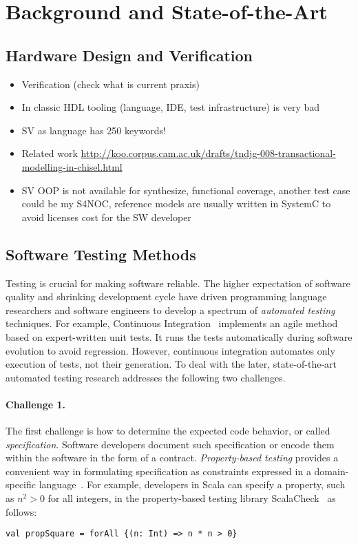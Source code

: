 \documentclass[fleqn,12pt]{article}
\begin{document}
\section{Background and State-of-the-Art}
\label{sec:background}


\subsection{Hardware Design and Verification}

\begin{itemize}
\item Verification (check what is current praxis)
\item In classic HDL tooling (language, IDE, test infrastructure) is very bad
\item SV as language has 250 keywords!
\item Related work \url{http://koo.corpus.cam.ac.uk/drafts/tndjg-008-transactional-modelling-in-chisel.html}
\item SV OOP is not available for synthesize, functional coverage, another test case could be my S4NOC, reference models are usually written in SystemC to avoid licenses cost for the SW developer
\end{itemize}


\subsection{Software Testing Methods}
Testing is crucial for making software reliable. The higher
expectation of software quality and shrinking development cycle have
driven programming language researchers and software engineers to
develop a spectrum of \emph{automated testing} techniques. For example,
Continuous Integration~\cite{duvall2007continuous} implements an agile
method based on expert-written unit tests. It runs the tests
automatically during software evolution to avoid regression.  However, continuous integration automates only execution
of tests, not their generation. To deal with the later,
state-of-the-art automated testing research addresses
the following two challenges.


\paragraph{Challenge 1.}
The first challenge is how to determine the expected code behavior, or
called \emph{specification}.  Software developers document such
specification or encode them within the software in the form of a
contract. \emph{Property-based testing} provides a convenient way in
formulating specification as constraints expressed in a
domain-specific language~\cite{DBLP:conf/icfp/ClaessenH00}.  For
example, developers in Scala can specify a property, such as $n^2>0$
for all integers, in the property-based testing library
ScalaCheck~\cite{nilsson2014scalacheck} as follows:
\begin{lstlisting}[numbers=none]
val propSquare = forAll {(n: Int) => n * n > 0}
\end{lstlisting}
\end{document}
